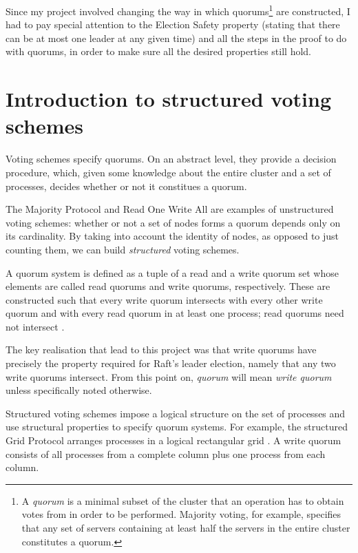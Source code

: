\documentclass[draft,11pt,chapterprefix=true,toc=bibliography,numbers=noendperiod,
               footnotes=multiple,twoside]{scrreprt}
\begin{document}
Since my project involved changing the way in which quorums\footnote{A \emph{quorum} is a minimal subset of the cluster that an operation has to obtain votes from in order to be performed. Majority voting, for example, specifies that any set of servers containing at least half the servers in the entire cluster constitutes a quorum.} are constructed, I had to pay special attention to the Election Safety property (stating that there can be at most one leader at any given time) and all the steps in the proof to do with quorums, in order to make sure all the desired properties still hold.

\section{Introduction to structured voting schemes\label{ssc:structured-voting-schemes}}

Voting schemes specify quorums. On an abstract level, they provide a decision procedure, which, given some knowledge about the entire cluster and a set of processes, decides whether or not it constitues a quorum.

The Majority Protocol and Read One Write All are examples of unstructured voting schemes: whether or not a set of nodes forms a quorum depends only on its cardinality. By taking into account the identity of nodes, as opposed to just counting them, we can build \emph{structured} voting schemes.


A quorum system is defined as a tuple of a read and a write quorum set whose elements are called read quorums and write quorums, respectively. These are constructed such that every write quorum intersects with every other write quorum and with every read quorum in at least one process; read quorums need not intersect \autocite{voting}.

The key realisation that lead to this project was that write quorums have precisely the property required for Raft's leader election, namely that any two write quorums intersect. From this point on, \emph{quorum} will mean \emph{write quorum} unless specifically noted otherwise.


Structured voting schemes impose a logical structure on the set of processes and use structural properties to specify quorum systems. For example, the structured Grid Protocol arranges processes in a logical rectangular grid \autocite{grid}. A write quorum consists of all processes from a complete column plus one process from each column.
\end{document}
